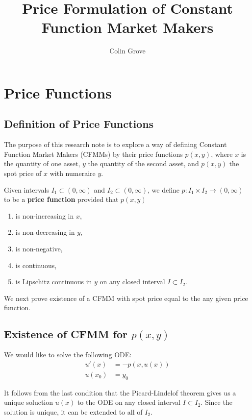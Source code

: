 \documentclass[11pt]{article} %
\title{Price Formulation of Constant Function Market Makers}
\author{Colin Grove}
\affil{HydraDX}
\date{} %
\begin{document}
\maketitle

\section{Price Functions}

\subsection{Definition of Price Functions}

The purpose of this research note is to explore a way of defining Constant Function Market Makers (CFMMs) by their price functions $p(x,y)$, where $x$ is the quantity of one asset, $y$ the quantity of the second asset, and $p(x,y)$ the spot price of $x$ with numeraire $y$.

Given intervals $I_1\subset (0,\infty)$ and $I_2\subset (0,\infty)$, we define $p:I_1 \times I_2 \to (0,\infty)$ to be a \textbf{price function} provided that $p(x,y)$
\begin{enumerate}
\item is non-increasing in $x$,
\item is non-decreasing in $y$,
\item is non-negative,
\item is continuous,
\item is Lipschitz continuous in $y$ on any closed interval $I \subset I_2$.
\end{enumerate}

We next prove existence of a CFMM with spot price equal to the any given price function.

\subsection{Existence of CFMM for $p(x,y)$}

We would like to solve the following ODE:
\begin{align*}
u'(x) &= -p(x,u(x))\\
u(x_0) &= y_0
\end{align*}

It follows from the last condition that the Picard-Lindelof theorem gives us a unique soluction $u(x)$ to the ODE on any closed interval $I\subset I_2$.
Since the solution is unique, it can be extended to all of $I_2$.
\end{document}
